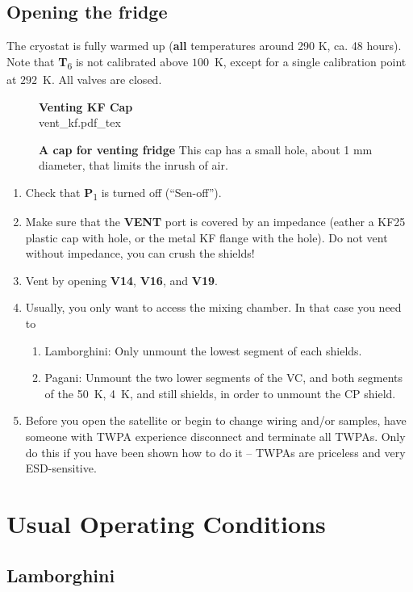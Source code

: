 \documentclass{article}[18pt,A4]
\newcommand{\thing}[1]{{\color{gray}\textsc{ \textbf{#1}}}}
\newcommand{\valve}[1]{{\color{gray}\textbf{V#1}}}
\newcommand{\pressure}[1]{{\color{pressurecolor}\textbf{P}\textsubscript{#1}}}
\newcommand{\temperature}[1]{{\color{temperaturecolor}\textbf{T}\textsubscript{#1}}}
\begin{document}
\subsection{Opening the fridge}
The cryostat is fully warmed up (\textbf{all} temperatures around 290 K, ca. 48 hours). Note that \temperature{6} is not calibrated above $100$~K,
except for a single calibration point at $292$~K. All valves are closed.

\begin{figure}[t]
\centering
\textbf{\color{sectioncolor}Venting KF Cap}\\
{vent_kf.pdf_tex}
\caption{\textbf{A cap for venting fridge}
This cap has a small hole, about 1 mm diameter, that limits the inrush of air.
}
\end{figure}


\begin{enumerate}
    \item Check that \pressure{1} is turned off (``Sen-off'').
    \item Make sure that the \thing{VENT} port is covered by an impedance (eather a KF25 plastic cap with hole, or the metal KF flange with the hole).
    Do not vent without impedance, you can crush the shields!
    \item Vent by opening \valve{14}, \valve{16}, and \valve{19}.
    \item Usually, you only want to access the mixing chamber. In that case you need to
        \begin{enumerate}
        \item Lamborghini: Only unmount the lowest segment of each shields. 
        \item Pagani: Unmount the two lower segments of the VC, and both segments of the 50~K, 4~K, and still shields, in order to unmount the CP shield.
        \end{enumerate}
    \item Before you open the satellite or begin to change wiring and/or samples, have someone with TWPA experience disconnect and terminate all TWPAs.
    Only do this if you have been shown how to do it -- TWPAs are priceless and very ESD-sensitive.
\end{enumerate}

\section{Usual Operating Conditions}

\subsection{Lamborghini}
\end{document}
